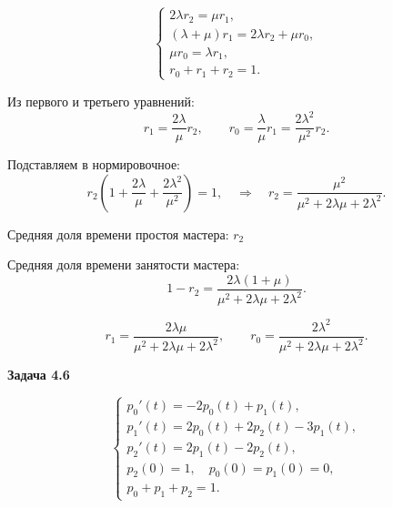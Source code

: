 \vspace{1em}

\[
	\begin{cases}
		2\lambda r_2 = \mu r_1,                     \\[4pt]
		(\lambda+\mu) r_1 = 2\lambda r_2 + \mu r_0, \\[4pt]
		\mu r_0 = \lambda r_1,                      \\[4pt]
		r_0 + r_1 + r_2 = 1.
	\end{cases}
\]

Из первого и третьего уравнений:
\[
	r_1 = \dfrac{2\lambda}{\mu} r_2,
	\qquad
	r_0 = \dfrac{\lambda}{\mu} r_1 = \dfrac{2\lambda^2}{\mu^2} r_2.
\]

Подставляем в нормировочное:
\[
	r_2\!\left(1 + \dfrac{2\lambda}{\mu} + \dfrac{2\lambda^2}{\mu^2}\right) = 1,
	\quad\Rightarrow\quad
	r_2 = \dfrac{\mu^2}{\mu^2 + 2\lambda\mu + 2\lambda^2}.
\]

Средняя доля времени простоя мастера: $r_2$

Средняя доля времени занятости мастера:
\[
	1 - r_2 = \dfrac{2\lambda(1+\mu)}{\mu^2 + 2\lambda\mu + 2\lambda^2}.
\]

\[
	r_1 = \dfrac{2\lambda\mu}{\mu^2 + 2\lambda\mu + 2\lambda^2},
	\qquad
	r_0 = \dfrac{2\lambda^2}{\mu^2 + 2\lambda\mu + 2\lambda^2}.
\]


\textbf{Задача 4.6} \quad [$\lambda = 1$, $\mu = 2$]

\vspace{1em}

\begin{center}
\end{center}

\vspace{1em}

\[
	\begin{cases}
		p_0'(t) = -2p_0(t) + p_1(t),           \\[4pt]
		p_1'(t) = 2p_0(t) + 2p_2(t) - 3p_1(t), \\[4pt]
		p_2'(t) = 2p_1(t) - 2p_2(t),           \\[4pt]
		p_2(0) = 1,\quad p_0(0) = p_1(0) = 0,  \\[4pt]
		p_0 + p_1 + p_2 = 1.
	\end{cases}
\]

